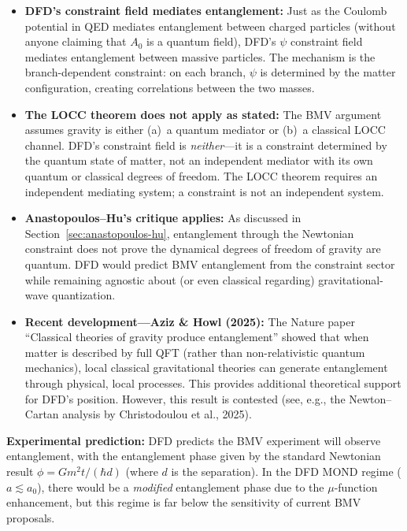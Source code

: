 \documentclass[12pt,a4paper]{article}
\begin{document}
\begin{itemize}
\item \textbf{DFD's constraint field mediates entanglement:} Just as the Coulomb potential in QED mediates entanglement between charged particles (without anyone claiming that $A_0$ is a quantum field), DFD's $\psi$ constraint field mediates entanglement between massive particles. The mechanism is the branch-dependent constraint: on each branch, $\psi$ is determined by the matter configuration, creating correlations between the two masses.

\item \textbf{The LOCC theorem does not apply as stated:} The BMV argument assumes gravity is either (a)~a quantum mediator or (b)~a classical LOCC channel. DFD's constraint field is \emph{neither}---it is a constraint determined by the quantum state of matter, not an independent mediator with its own quantum or classical degrees of freedom. The LOCC theorem requires an independent mediating system; a constraint is not an independent system.

\item \textbf{Anastopoulos--Hu's critique applies:} As discussed in Section~\ref{sec:anastopoulos-hu}, entanglement through the Newtonian constraint does not prove the dynamical degrees of freedom of gravity are quantum. DFD would predict BMV entanglement from the constraint sector while remaining agnostic about (or even classical regarding) gravitational-wave quantization.

\item \textbf{Recent development---Aziz \& Howl (2025):} The Nature paper ``Classical theories of gravity produce entanglement'' showed that when matter is described by full QFT (rather than non-relativistic quantum mechanics), local classical gravitational theories can generate entanglement through physical, local processes. This provides additional theoretical support for DFD's position. However, this result is contested (see, e.g., the Newton--Cartan analysis by Christodoulou et al., 2025).
\end{itemize}

\textbf{Experimental prediction:} DFD predicts the BMV experiment will observe entanglement, with the entanglement phase given by the standard Newtonian result $\phi = Gm^2 t/(\hbar d)$ (where $d$ is the separation). In the DFD MOND regime ($a \lesssim a_0$), there would be a \emph{modified} entanglement phase due to the $\mu$-function enhancement, but this regime is far below the sensitivity of current BMV proposals.
\end{document}
